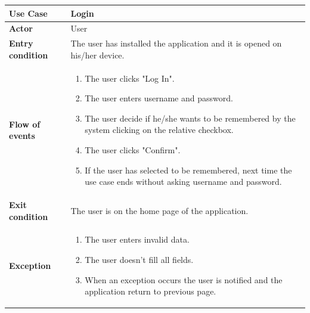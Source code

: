 \documentclass[../main.tex]{subfiles}
\begin{document}
	\begin{center}
		\begin{tabular}{p{3cm}p{8.28cm}}
			\hline
			\textbf{Use Case} & Login\\
			\hline
			\textbf{Actor} & User\\
			\hline
			\textbf{Entry condition} & The user has installed the application and it is opened on his/her device.\\
			\hline
			\textbf{Flow of events} & \begin{enumerate}
				\linespread{0}\item The user clicks "Log In".
				\linespread{0}\item The user enters username and password.
				\linespread{0}\item The user decide if he/she wants to be remembered by the system clicking on the relative checkbox.
				\linespread{0}\item The user clicks "Confirm".
				\linespread{0}\item If the user has selected to be remembered, next time the use case ends without asking username and password.
			\end{enumerate}\\
			\hline
			\textbf{Exit condition} & The user is on the home page of the application.\\
			\hline
			\textbf{Exception} & \begin{enumerate}
				\linespread{0}\item The user enters invalid data.
				\linespread{0}\item The user doesn't fill all fields.
				\linespread{0}\item When an exception occurs the user is notified and the application return to previous page.
			\end{enumerate}\\
			\hline
		\end{tabular}
	\end{center}
	\vspace*{3cm}
\end{document}
